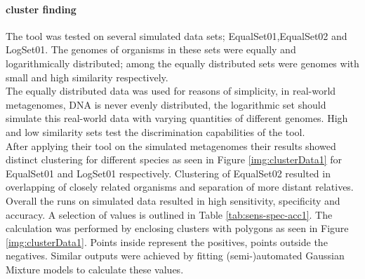 \documentclass[twocolumn]{bmcart}%
\begin{document}
\paragraph*{cluster finding}
The tool was tested on several simulated data sets; EqualSet01,EqualSet02 and LogSet01. The genomes of organisms in these sets were equally and logarithmically distributed; among the equally distributed sets were genomes with small and high similarity respectively. \\
The equally distributed data was used for reasons of simplicity, in real-world metagenomes, DNA is never evenly distributed, the logarithmic set should simulate this real-world data with varying quantities of different genomes. High and low similarity sets test the discrimination capabilities of the tool.\\
After applying their tool on the simulated metagenomes their results showed distinct clustering for different species as seen in Figure \ref{img:clusterData1} for EqualSet01 and LogSet01 respectively. Clustering of EqualSet02 resulted in overlapping of closely related organisms and separation of more distant relatives. \\
Overall the runs on simulated data resulted in high sensitivity, specificity and accuracy. A selection of values is outlined in Table \ref{tab:sens-spec-acc1}. The calculation was performed by enclosing clusters with polygons as seen in Figure \ref{img:clusterData1}. Points inside represent the positives, points outside the negatives. Similar outputs were achieved by fitting (semi-)automated Gaussian Mixture models to calculate these values.
\end{document}
